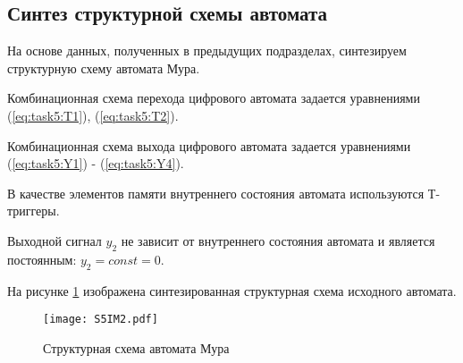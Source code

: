 \subsection{Синтез структурной схемы автомата}

На основе данных, полученных в предыдущих подразделах, синтезируем структурную схему автомата Мура.

Комбинационная схема перехода цифрового автомата задается уравнениями (\ref{eq:task5:T1}), (\ref{eq:task5:T2}).

Комбинационная схема выхода цифрового автомата задается уравнениями (\ref{eq:task5:Y1}) - (\ref{eq:task5:Y4}).

В качестве элементов памяти внутреннего состояния автомата используются Т-триггеры.

Выходной сигнал $y_2$ не зависит от внутреннего состояния автомата и является постоянным: $y_2 = const = 0$.

На рисунке \ref{fig:task5:scheme} изображена синтезированная структурная схема исходного автомата.

\begin{figure}[h!]
    \centering
    \texttt{[image: S5IM2.pdf]}
    \caption{Структурная схема автомата Мура}
    \label{fig:task5:scheme}
\end{figure}